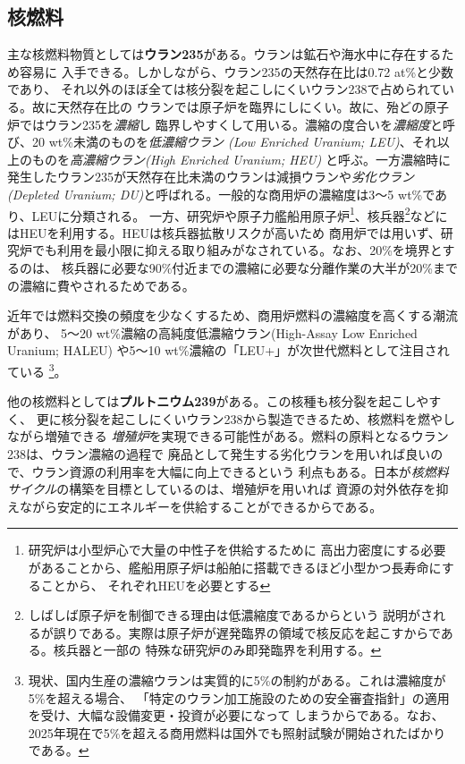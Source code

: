 \subsection{核燃料}
主な核燃料物質としては\textbf{ウラン235}がある。ウランは鉱石や海水中に存在するため容易に
入手できる。しかしながら、ウラン235の天然存在比は0.72 at\%と少数であり、
それ以外のほぼ全ては核分裂を起こしにくいウラン238で占められている。故に天然存在比の
ウランでは原子炉を臨界にしにくい。故に、殆どの原子炉ではウラン235を\emph{濃縮}し
臨界しやすくして用いる。濃縮の度合いを\emph{濃縮度}と呼び、20 wt\%未満のものを\emph{低濃縮ウラン
(Low Enriched Uranium; LEU)}、それ以上のものを\emph{高濃縮ウラン(High Enriched Uranium; HEU)}
と呼ぶ。一方濃縮時に発生したウラン235が天然存在比未満のウランは減損ウランや\emph{劣化ウラン
(Depleted Uranium; DU)}と呼ばれる。一般的な商用炉の濃縮度は3～5 wt\%であり、LEUに分類される。
一方、研究炉や原子力艦船用原子炉\footnote{研究炉は小型炉心で大量の中性子を供給するために
高出力密度にする必要があることから、艦船用原子炉は船舶に搭載できるほど小型かつ長寿命にすることから、
それぞれHEUを必要とする}、核兵器\footnote{しばしば原子炉を制御できる理由は低濃縮度であるからという
説明がされるが誤りである。実際は原子炉が遅発臨界の領域で核反応を起こすからである。核兵器と一部の
特殊な研究炉のみ即発臨界を利用する。}などにはHEUを利用する。HEUは核兵器拡散リスクが高いため
商用炉では用いず、研究炉でも利用を最小限に抑える取り組みがなされている。なお、20\%を境界とするのは、
核兵器に必要な90\%付近までの濃縮に必要な分離作業の大半が20\%までの濃縮に費やされるためである。

近年では燃料交換の頻度を少なくするため、商用炉燃料の濃縮度を高くする潮流があり、
5～20 wt\%濃縮の高純度低濃縮ウラン(High-Assay Low Enriched Uranium; HALEU)
や5～10 wt\%濃縮の「LEU+」が次世代燃料として注目されている
\footnote{現状、国内生産の濃縮ウランは実質的に5\%の制約がある。これは濃縮度が5\%を超える場合、
「特定のウラン加工施設のための安全審査指針」の適用を受け、大幅な設備変更・投資が必要になって
しまうからである。なお、2025年現在で5\%を超える商用燃料は国外でも照射試験が開始されたばかり
である\cite{WNN-LEUplus-2025Apr}\cite{FEPC-LEUplus-2024Feb}。}。

他の核燃料としては\textbf{プルトニウム239}がある。この核種も核分裂を起こしやすく、
更に核分裂を起こしにくいウラン238から製造できるため、核燃料を燃やしながら増殖できる
\emph{増殖炉}を実現できる可能性がある。燃料の原料となるウラン238は、ウラン濃縮の過程で
廃品として発生する劣化ウランを用いれば良いので、ウラン資源の利用率を大幅に向上できるという
利点もある。日本が\emph{核燃料サイクル}の構築を目標としているのは、増殖炉を用いれば
資源の対外依存を抑えながら安定的にエネルギーを供給することができるからである。

\printbibliography[segment=\therefsegment,heading=subbibliography]

\newpage